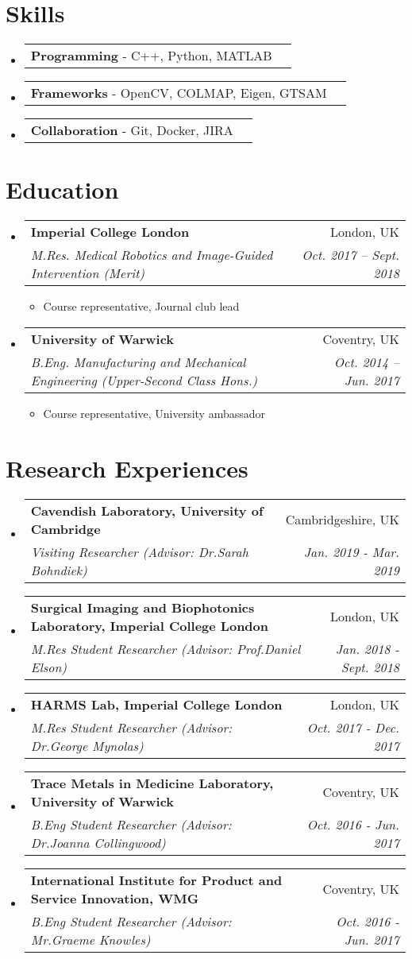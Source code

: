 \documentclass[letterpaper,11pt]{article}
\makeatletter
\newcommand{\resumeItem}[1]{
  \item\small{
    {#1 \vspace{-2pt}}
  }
}
\newcommand{\resumeSubheading}[4]{
  \vspace{-1pt}\item
    \begin{tabular*}{0.97\textwidth}[t]{l@{\extracolsep{\fill}}r}
      \textbf{#1} & #2 \\
      \textit{\small#3} & \textit{\small #4} \\
    \end{tabular*}\vspace{-5pt}
}
\newcommand{\resumeResearch}[5]{
  \vspace{-1pt}\item
    \begin{tabular*}{0.97\textwidth}[t]{l@{\extracolsep{\fill}}r}
      \textbf{#1} & #2 \\
      \textit{\small#3} {\small #4 \vspace{-2pt}} & \textit{\small #5} \\
    \end{tabular*}\vspace{-5pt}
}
\newcommand{\resumeSkills}[1]{
  \item
    \begin{tabular*}{0.97\textwidth}[t]{l@{\extracolsep{\fill}}r}
      #1
    \end{tabular*}
}
\newcommand{\resumeSubHeadingListStart}{\begin{itemize}[leftmargin=*]}
\newcommand{\resumeSubHeadingListEnd}{\end{itemize}}
\newcommand{\resumeItemListStart}{\begin{itemize}}
\newcommand{\resumeItemListEnd}{\end{itemize}\vspace{-5pt}}
\makeatother
\begin{document}

\section{Skills}
  \resumeSubHeadingListStart
    \resumeSkills{\textbf{Programming} - C++, Python, MATLAB}
    \resumeSkills{\textbf{Frameworks} - OpenCV, COLMAP, Eigen, GTSAM}
    \resumeSkills{\textbf{Collaboration} - Git, Docker, JIRA}
  \resumeSubHeadingListEnd

\section{Education}
  \resumeSubHeadingListStart
    \resumeSubheading
      {Imperial College London}{London, UK}
      {M.Res. Medical Robotics and Image-Guided Intervention (Merit)}{Oct. 2017 -- Sept. 2018}
      \resumeItemListStart
          \resumeItem{Course representative, Journal club lead}
      \resumeItemListEnd
    \resumeSubheading
      {University of Warwick}{Coventry, UK}
      {B.Eng. Manufacturing and Mechanical Engineering (Upper-Second Class Hons.)}{Oct. 2014 -- Jun. 2017}
      \resumeItemListStart
          \resumeItem{Course representative, University ambassador}
      \resumeItemListEnd

  \resumeSubHeadingListEnd

\section{Research Experiences}
  \resumeSubHeadingListStart

    \resumeResearch
      {Cavendish Laboratory, University of Cambridge}{Cambridgeshire, UK}
      {Visiting Researcher (Advisor: Dr.Sarah Bohndiek)}{}{Jan. 2019 - Mar. 2019}
    \resumeResearch
      {Surgical Imaging and Biophotonics Laboratory, Imperial College London}{London, UK}
      {M.Res Student Researcher (Advisor: Prof.Daniel Elson)}{}{Jan. 2018 - Sept. 2018}
      \resumeResearch
      {HARMS Lab, Imperial College London}{London, UK}
      {M.Res Student Researcher (Advisor: Dr.George Mynolas)}{}{Oct. 2017 - Dec. 2017}
    \resumeResearch
      {Trace Metals in Medicine Laboratory, University of Warwick}{Coventry, UK}
      {B.Eng Student Researcher (Advisor: Dr.Joanna Collingwood)}{}{Oct. 2016 - Jun. 2017}
     \resumeResearch
      {International Institute for Product and Service Innovation, WMG}{Coventry, UK}
      {B.Eng Student Researcher (Advisor: Mr.Graeme Knowles)}{}{Oct. 2016 - Jun. 2017}
  \resumeSubHeadingListEnd
\end{document}
